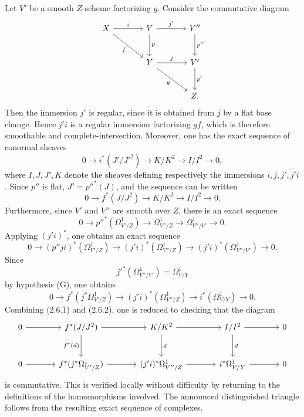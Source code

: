 \documentclass[11pt]{article}
\begin{document}
Let $V'$ be a smooth $Z$-scheme factorizing $g$. Consider the commutative diagram
\[
\begin{tikzcd}[column sep=large,row sep=large]
X \arrow[r,"i"] \arrow[dr,"f"'] & V \arrow[r,"j'"] \arrow[d,"p"] & V'' \arrow[d,"p''"]\\
& Y \arrow[r,"j"] \arrow[dr,"g"'] & V' \arrow[d,"p'"]\\
& & Z .
\end{tikzcd}
\]
Then the immersion $j'$ is regular, since it is obtained from $j$ by a flat base change. Hence $j'i$ is a regular immersion factorizing $gf$, which is therefore smoothable and complete-intersection. Moreover, one has the exact sequence of conormal sheaves
\[
0\longrightarrow i^*(J'/J'^2)\longrightarrow K/K^2\longrightarrow I/I^2\longrightarrow0,
\]
where $I,J,J',K$ denote the sheaves defining respectively the immersions $i,j,j',j'i$. Since $p''$ is flat, $J'=p''^*(J)$, and the sequence can be written
\begin{equation}\tag{2.6.1}
0\longrightarrow f^*(J/J^2)\longrightarrow K/K^2\longrightarrow I/I^2\longrightarrow0.
\end{equation}
Furthermore, since $V'$ and $V''$ are smooth over $Z$, there is an exact sequence
\[
0\longrightarrow p''^*(\Omega^1_{V'/Z})\longrightarrow\Omega^1_{V''/Z}\longrightarrow\Omega^1_{V''/V'}\longrightarrow0.
\]
Applying $(j'i)^*$, one obtains an exact sequence
\[
0\longrightarrow (p''ji)^*(\Omega^1_{V'/Z})\longrightarrow (j'i)^*(\Omega^1_{V''/Z})\longrightarrow (j'i)^*(\Omega^1_{V''/V'})\longrightarrow0.
\]
Since
\[
j'^*(\Omega^1_{V''/V'})=\Omega^1_{V/Y}
\]
by hypothesis (G), one obtains
\begin{equation}\tag{2.6.2}
0\longrightarrow f^*(j^*\Omega^1_{V'/Z})\longrightarrow (j'i)^*(\Omega^1_{V''/Z})\longrightarrow i^*(\Omega^1_{V/Y})\longrightarrow0.
\end{equation}
Combining (2.6.1) and (2.6.2), one is reduced to checking that the diagram
\[
\begin{tikzcd}[column sep=large,row sep=large]
0 \arrow[r] & f^*(J/J^2) \arrow[r] \arrow[d,"f^*(d)"'] & K/K^2 \arrow[r] \arrow[d,"d"] & I/I^2 \arrow[r] \arrow[d,"d"] & 0\\
0 \arrow[r] & f^*(j^*\Omega^1_{V'/Z}) \arrow[r] & (j'i)^*\Omega^1_{V''/Z} \arrow[r] & i^*\Omega^1_{V/Y} \arrow[r] & 0
\end{tikzcd}
\]
is commutative. This is verified locally without difficulty by returning to the definitions of the homomorphisms involved. The announced distinguished triangle follows from the resulting exact sequence of complexes.
\end{document}
